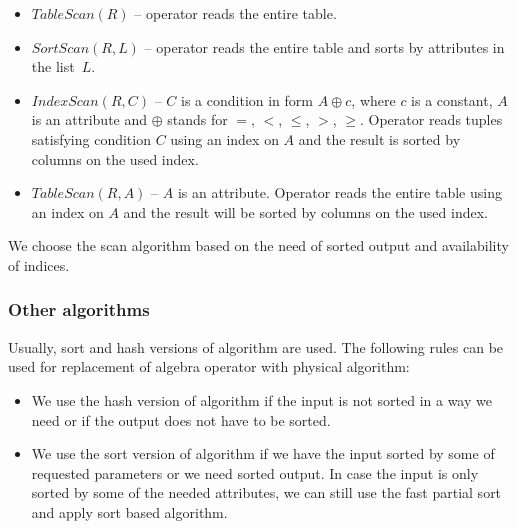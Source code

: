 \begin{itemize}
\item $TableScan(R)$ -- operator reads the entire table.

\item $SortScan(R,L)$ -- operator reads the entire table and sorts by attributes in the list~$L$.

\item $IndexScan(R,C)$ -- $C$ is a condition in form $A\oplus c$, where $c$ is a  constant, $A$ is an attribute and $\oplus$ stands for $=$, $<$, $\leq$, $>$, $\geq$. Operator reads tuples satisfying condition $C$ using an index on $A$ and the result is sorted by columns on the used index.

\item $TableScan(R,A)$ -- $A$ is an attribute. Operator reads the entire table using an index on $A$ and the result will be sorted by columns on the used index.

\end{itemize}

We choose the scan algorithm based on the need of sorted output and availability of indices.

\subsubsection{Other algorithms}

Usually, sort and hash versions of algorithm are used. The following rules can be used for replacement of algebra operator with physical algorithm:

\begin{itemize}
\item We use the hash version of algorithm if the input is not sorted in a way we need or if the output does not have to be sorted.

\item We use the sort version of algorithm if we have the input sorted by some of requested parameters or we need sorted output. In case the input is only sorted by some of the needed attributes, we can still use the fast partial sort and apply sort based algorithm.

\end{itemize}